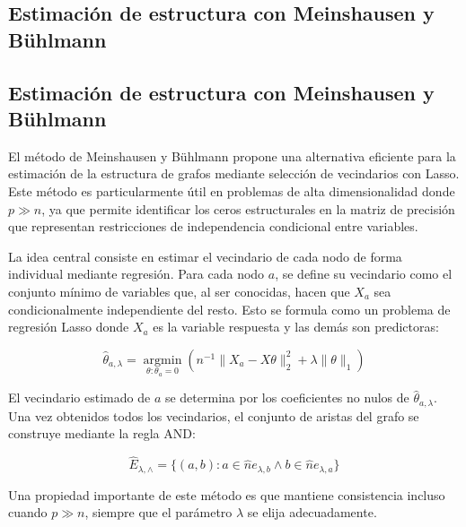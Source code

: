 \documentclass{article}
\begin{document}
\subsection{Estimación de estructura con Meinshausen y Bühlmann}

\subsection{Estimación de estructura con Meinshausen y Bühlmann}

El método de Meinshausen y Bühlmann propone una alternativa eficiente para la estimación de la estructura de grafos mediante selección de vecindarios con Lasso. Este método es particularmente útil en problemas de alta dimensionalidad donde $p \gg n$, ya que permite identificar los ceros estructurales en la matriz de precisión que representan restricciones de independencia condicional entre variables.

La idea central consiste en estimar el vecindario de cada nodo de forma individual mediante regresión. Para cada nodo $a$, se define su vecindario como el conjunto mínimo de variables que, al ser conocidas, hacen que $X_a$ sea condicionalmente independiente del resto. Esto se formula como un problema de regresión Lasso donde $X_a$ es la variable respuesta y las demás son predictoras:

\begin{equation}
    \hat{\theta}_{a,\lambda} = \operatorname*{argmin}_{\theta : \theta_a=0} \left(n^{-1}\|X_a - X\theta\|_2^2 + \lambda\|\theta\|_1\right)
\end{equation}

El vecindario estimado de $a$ se determina por los coeficientes no nulos de $\hat{\theta}_{a,\lambda}$. Una vez obtenidos todos los vecindarios, el conjunto de aristas del grafo se construye mediante la regla AND:

\begin{equation}
    \hat{E}_{\lambda, \wedge} = \{(a, b) : a \in \hat{n}e_{\lambda, b} \land b \in \hat{n}e_{\lambda, a}\}
\end{equation}

Una propiedad importante de este método es que mantiene consistencia incluso cuando $p \gg n$, siempre que el parámetro $\lambda$ se elija adecuadamente.
\end{document}
